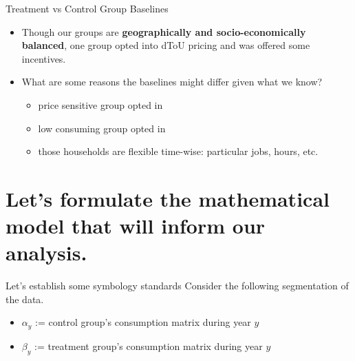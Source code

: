 \documentclass{beamer}
\begin{document}
\begin{frame}{Treatment vs Control Group Baselines}
  \begin{itemize}
    \item<+-> Though our groups are \textbf{geographically and socio-economically balanced}, one group opted into dToU pricing and was offered some incentives.
    \item<+-> What are some reasons the baselines might differ given what we know?
    \begin{itemize}
      \item<+-> price sensitive group opted in
      \item<+-> low consuming group opted in
      \item<+-> those households are flexible time-wise: particular jobs, hours, etc.\
    \end{itemize}
  \end{itemize}
\end{frame}

\section{Let's formulate the mathematical model that will inform our analysis.}

\begin{frame}{Let's establish some symbology standards}
  Consider the following segmentation of the data.
  \begin{itemize}
    \item $\alpha_y$ := control group's consumption matrix during year $y$
    \item $\beta_y$ := treatment group's consumption matrix during year $y$
  \end{itemize}
\end{frame}
\end{document}
